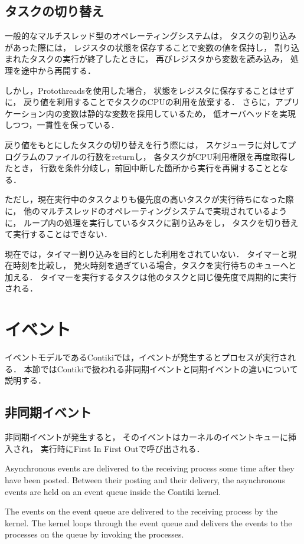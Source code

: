 \subsection{タスクの切り替え}
一般的なマルチスレッド型のオペレーティングシステムは，
タスクの割り込みがあった際には，
レジスタの状態を保存することで変数の値を保持し，
割り込まれたタスクの実行が終了したときに，
再びレジスタから変数を読み込み，
処理を途中から再開する．

しかし，Protothreadsを使用した場合，
状態をレジスタに保存することはせずに，
戻り値を利用することでタスクのCPUの利用を放棄する．
さらに，アプリケーション内の変数は静的な変数を採用しているため，
低オーバヘッドを実現しつつ，一貫性を保っている．

戻り値をもとにしたタスクの切り替えを行う際には，
スケジューラに対してプログラムのファイルの行数をreturnし，
各タスクがCPU利用権限を再度取得したとき，
行数を条件分岐し，前回中断した箇所から実行を再開することとなる．

ただし，現在実行中のタスクよりも優先度の高いタスクが実行待ちになった際に，
他のマルチスレッドのオペレーティングシステムで実現されているように，
ループ内の処理を実行しているタスクに割り込みをし，
タスクを切り替えて実行することはできない．

現在では，タイマー割り込みを目的とした利用をされていない．
タイマーと現在時刻を比較し，
発火時刻を過ぎている場合，タスクを実行待ちのキューへと加える．
タイマーを実行するタスクは他のタスクと同じ優先度で周期的に実行される．

\section{イベント}
イベントモデルであるContikiでは，イベントが発生するとプロセスが実行される．
本節ではContikiで扱われる非同期イベントと同期イベントの違いについて説明する．


\subsection{非同期イベント}
非同期イベントが発生すると，
そのイベントはカーネルのイベントキューに挿入され，
実行時にFirst In First Outで呼び出される．

Asynchronous events are delivered to the receiving process some time after they have been posted.
Between their posting and their delivery, 
the asynchronous events are held on an event queue inside the Contiki kernel.

The events on the event queue are delivered to the receiving process by the kernel.
The kernel loops through the event queue and 
delivers the events to the processes on the queue by invoking the processes.



